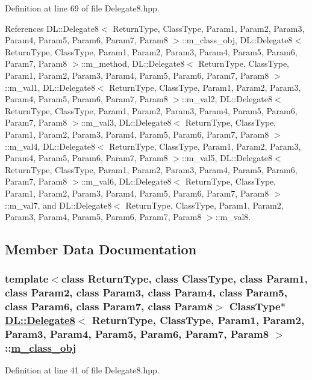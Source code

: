Definition at line 69 of file Delegate8.hpp.

References DL::Delegate8$<$ Return\-Type, Class\-Type, Param1, Param2, Param3, Param4, Param5, Param6, Param7, Param8 $>$::m\_\-class\_\-obj, DL::Delegate8$<$ Return\-Type, Class\-Type, Param1, Param2, Param3, Param4, Param5, Param6, Param7, Param8 $>$::m\_\-method, DL::Delegate8$<$ Return\-Type, Class\-Type, Param1, Param2, Param3, Param4, Param5, Param6, Param7, Param8 $>$::m\_\-val1, DL::Delegate8$<$ Return\-Type, Class\-Type, Param1, Param2, Param3, Param4, Param5, Param6, Param7, Param8 $>$::m\_\-val2, DL::Delegate8$<$ Return\-Type, Class\-Type, Param1, Param2, Param3, Param4, Param5, Param6, Param7, Param8 $>$::m\_\-val3, DL::Delegate8$<$ Return\-Type, Class\-Type, Param1, Param2, Param3, Param4, Param5, Param6, Param7, Param8 $>$::m\_\-val4, DL::Delegate8$<$ Return\-Type, Class\-Type, Param1, Param2, Param3, Param4, Param5, Param6, Param7, Param8 $>$::m\_\-val5, DL::Delegate8$<$ Return\-Type, Class\-Type, Param1, Param2, Param3, Param4, Param5, Param6, Param7, Param8 $>$::m\_\-val6, DL::Delegate8$<$ Return\-Type, Class\-Type, Param1, Param2, Param3, Param4, Param5, Param6, Param7, Param8 $>$::m\_\-val7, and DL::Delegate8$<$ Return\-Type, Class\-Type, Param1, Param2, Param3, Param4, Param5, Param6, Param7, Param8 $>$::m\_\-val8.

\subsection{Member Data Documentation}
\hypertarget{classDL_1_1Delegate8_r0}{
\subsubsection[m\_\-class\_\-obj]{\setlength{\rightskip}{0pt plus 5cm}template$<$class Return\-Type, class Class\-Type, class Param1, class Param2, class Param3, class Param4, class Param5, class Param6, class Param7, class Param8$>$ Class\-Type$\ast$ \hyperlink{classDL_1_1Delegate8}{DL::Delegate8}$<$ Return\-Type, Class\-Type, Param1, Param2, Param3, Param4, Param5, Param6, Param7, Param8 $>$::\hyperlink{classDL_1_1Delegate8_r0}{m\_\-class\_\-obj}}}
\label{classDL_1_1Delegate8_r0}




Definition at line 41 of file Delegate8.hpp.

